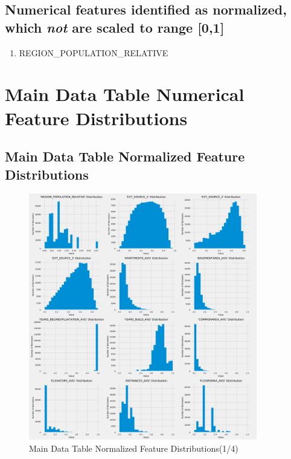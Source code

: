 \documentclass[12pt, letterpaper]{article}
\begin{document}
\begin{appendices}
\subsection{Numerical features identified as normalized, which \textit{not} are scaled to range [0,1]}
\label{numericalfeatnormalizednotunitrange}
\footnotesize
\begin{enumerate}
 \item REGION_POPULATION_RELATIVE
\end{enumerate}
\normalsize

\pagebreak

\section{Main Data Table Numerical Feature Distributions}
\label{appendix:maindatatablefeaturedistributions}

\subsection{Main Data Table Normalized Feature Distributions}
\label{normalfeaturedistribs}

\begin{figure}[ht]
\includegraphics[width=0.89\textwidth]{main-data-table-normal-feature-distribs-p1}
\centering
\caption{Main Data Table Normalized Feature Distributions(1/4)}
\end{figure}


\end{appendices}
\end{document}

